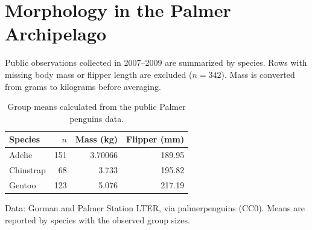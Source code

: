\documentclass[11pt]{article}
\begin{document}
\section{Morphology in the Palmer Archipelago}
Public observations collected in 2007--2009 are summarized by species.
Rows with missing body mass or flipper length are excluded ($n=342$).
Mass is converted from grams to kilograms before averaging.
\begin{table}[htbp]
\centering
\begin{tabular}{lrrr}
\toprule
Species & $n$ & Mass (kg) & Flipper (mm) \\
\midrule
Adelie & 151 & 3.70066 & 189.95 \\
\midrule
Chinstrap & 68 & 3.733 & 195.82 \\
Gentoo & 123 & 5.076 & 217.19 \\
\bottomrule
\end{tabular}
\caption{Group means calculated from the public Palmer penguins data.}
\label{tab:morphology}
\end{table}
Data: Gorman and Palmer Station LTER, via palmerpenguins (CC0).
Means are reported by species with the observed group sizes.
\end{document}
